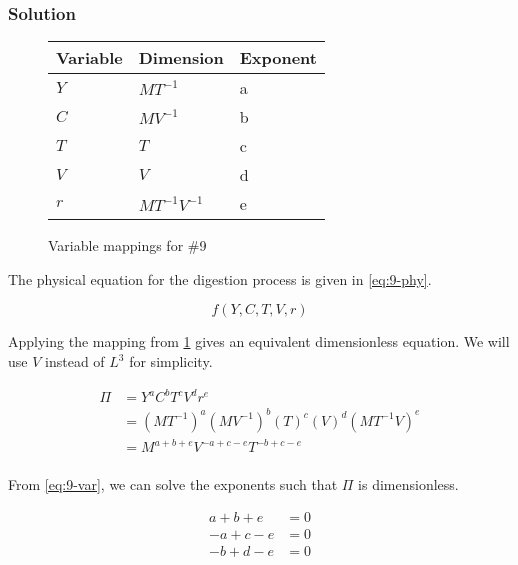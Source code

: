 \documentclass[12pt]{article}
\begin{document}
  \subsubsection*{Solution}
  \begin{figure}
    \centering
    \begin{tabularx}{0.5\textwidth}{XXX}
      Variable & Dimension & Exponent \\ \hline
      $Y$ & $MT^{-1}$ & a \\
      $C$ & $MV^{-1}$ & b \\
      $T$ & $T$ & c \\
      $V$ & $V$ & d \\
      $r$ & $MT^{-1}V^{-1}$ & e \\
    \end{tabularx}
    \caption{Variable mappings for \#9}
    \label{fig:9-var-mappings}
  \end{figure}

  The physical equation for the digestion process is given in \cref{eq:9-phy}.

  \begin{equation}
    \label{eq:9-phy}
    f(Y,C,T,V,r)
  \end{equation}

  Applying the mapping from \cref{fig:9-var-mappings} gives an equivalent
  dimensionless equation. We will use $V$ instead of $L^3$ for simplicity.

  \begin{equation}
    \label{eq:9-var}
    \begin{aligned}
      \Pi &= Y^a C^b T^c V^d r^e \\
      &= (MT^{-1})^a (MV^{-1})^b (T)^c (V)^d (MT^{-1}V)^e \\
      &= M^{a+b+e}V^{-a+c-e}T^{-b+c-e} \\
    \end{aligned}
  \end{equation}

  From \cref{eq:9-var}, we can solve the exponents such that $\Pi$ is
  dimensionless.

  \begin{equation}
    \label{eq:9-exp-eqs}
    \begin{aligned}
      a + b + e &= 0 \\
      -a + c - e &= 0 \\
      -b + d - e &= 0 \\
    \end{aligned}
  \end{equation}
\end{document}
